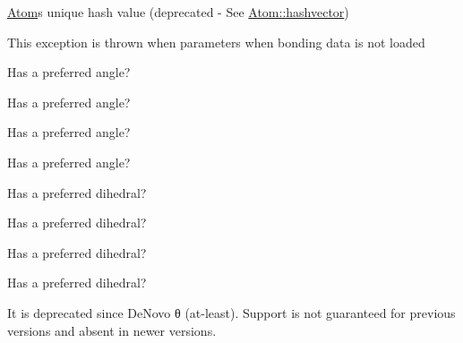 
\begin{DoxyRefList}
\item[Member \mbox{\hyperlink{classAtom_af5d753dfd1f6c69ed18be8d1baf72c32}{Atom\+::hashvalue}} ]\label{deprecated__deprecated000027}%
%
\mbox{\hyperlink{classAtom}{Atom}}\textquotesingle{}s unique hash value (deprecated -\/ See \mbox{\hyperlink{classAtom_ad11c393edfbf40afa38aad0e70bfd2ae}{Atom\+::hashvector}})  
\item[Class \mbox{\hyperlink{classBondParametersNotLoadedException}{Bond\+Parameters\+Not\+Loaded\+Exception}} ]\label{deprecated__deprecated000029}%
%
This exception is thrown when parameters when bonding data is not loaded  
\item[Member \mbox{\hyperlink{classchemtools_1_1Rule_a24a54b4166ac48963112712fc2960d86}{chemtools\+::Rule\+::angp}} ]\label{deprecated__deprecated000001}%
%
Has a preferred angle? 

\label{deprecated__deprecated000019}%
%
Has a preferred angle? 

\label{deprecated__deprecated000007}%
%
Has a preferred angle? 

\label{deprecated__deprecated000013}%
%
Has a preferred angle?  
\item[Member \mbox{\hyperlink{classchemtools_1_1Rule_acb8bd28f84ef1abda95437ddd5f4143d}{chemtools\+::Rule\+::dihp}} ]\label{deprecated__deprecated000002}%
%
Has a preferred dihedral? 

\label{deprecated__deprecated000020}%
%
Has a preferred dihedral? 

\label{deprecated__deprecated000014}%
%
Has a preferred dihedral? 

\label{deprecated__deprecated000008}%
%
Has a preferred dihedral?  
\item[Member \mbox{\hyperlink{classchemtools_1_1Rule_ae4a3156ee433da7534dc9f597b53020b}{chemtools\+::Rule\+::predict\+Angle}} (const \mbox{\hyperlink{classForceField}{Force\+Field}} \&ff, \mbox{\hyperlink{classAtom}{Atom}} $\ast$a1, \mbox{\hyperlink{classAtom}{Atom}} $\ast$a2, \mbox{\hyperlink{classAtom}{Atom}} $\ast$a3)]\label{deprecated__deprecated000011}%
%
It is deprecated since De\+Novo θ (at-\/least). Support is not guaranteed for previous versions and absent in newer versions. 


\end{DoxyRefList}
